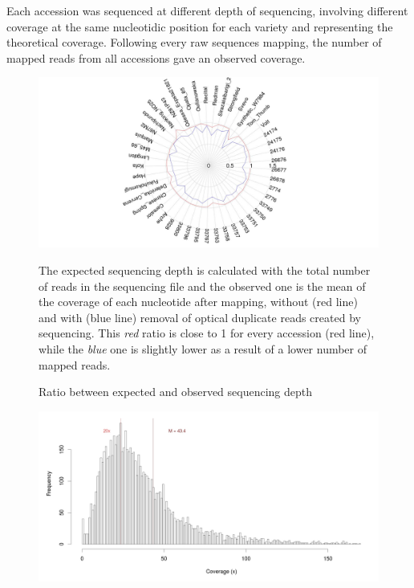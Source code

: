 \documentclass[a4paper, 12pt]{article}
\begin{document}
\begin{onehalfspace}
Each accession was sequenced at different depth of sequencing, involving different coverage at the same nucleotidic position for each variety and representing the theoretical coverage. Following every raw sequences mapping, the number of mapped reads from all accessions gave an observed coverage.

\newpage 
\thispagestyle{empty}
        \begin{figure}
        \vspace{-1.5cm}
          \centering \includegraphics[scale=0.2]{Figures/Figure_7.jpg}
          \vspace{0.5cm}
          \caption{Ratio between expected and observed sequencing depth}
          \label{fig:F7}
        \footnotesize{The expected sequencing depth is calculated with the total number of reads in the sequencing file and the observed one is the mean of the coverage of each nucleotide after mapping, without (red line) and with (blue line) removal of optical duplicate reads created by sequencing. This \textit{red} ratio is close to 1 for every accession (red line), while the \textit{blue} one is slightly lower as a result of a lower number of mapped reads.}
        \end{figure}
        \begin{figure}
        \vspace{-0.7cm}
          \centering \includegraphics[scale=0.2]{Figures/Figure_8.jpg}

\end{figure}
\end{onehalfspace}
\end{document}
